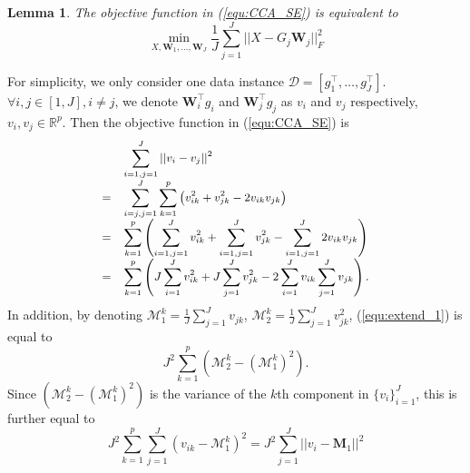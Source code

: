 \documentclass[a4paper]{article}
\newtheorem{lemma}[theorem]{Lemma}
\newenvironment{proof}[1][Proof]{\begin{trivlist}
\item[\hskip \labelsep {\bfseries #1}]}{\end{trivlist}}
\begin{document}
\begin{lemma}
The objective function in (\ref{equ:CCA_SE}) is equivalent to
\begin{equation}
        \min_{X, \mathbf{W}_1, \ldots,\mathbf{W}_J} \frac{1}{J} \sum_{j=1}^{J} ||X-G_j \mathbf{W}_j||_F^2  
\end{equation}
    \label{lemma:equ}
\end{lemma}
\begin{proof}
For simplicity, we only consider one data instance $\mathcal{D}=[g_1^\top, \ldots, g_J^\top]$. $\forall i,j\in [1,J], i\neq j$, we denote $\mathbf{W}_i^\top g_i$ and $\mathbf{W}_j^\top g_j$ as $v_i$ and $v_j$ respectively, $v_i,v_j\in\mathbb{R}^p$. Then the
    objective function in (\ref{equ:CCA_SE}) is
    \begin{equation}
        \small
        \begin{array}{cl}
              &\displaystyle\sum_{i=1,j=1}^J ||v_i-v_j||^2 \\   
            = &\displaystyle\sum_{i=j,j=1}^J \sum_{k=1}^p \left(v_{ik}^2+v_{jk}^2-2v_{ik}v_{jk}\right)\\
            = &\displaystyle\sum_{k=1}^p \left(\sum_{i=1,j=1}^J v_{ik}^2+\sum_{i=1,j=1}^J v_{jk}^2- \sum_{i=1,j=1}^J2v_{ik}v_{jk}\right) \\
            = &\displaystyle\sum_{k=1}^p \left(J\sum_{i=1}^J v_{ik}^2+J\sum_{j=1}^J v_{jk}^2- 2\sum_{i=1}^Jv_{ik}\sum_{j=1}^J v_{jk}\right).
        \end{array}
        \label{equ:extend_1}
    \end{equation}
    In addition, by denoting $\mathcal{M}_1^k=\frac{1}{J}\sum_{j=1}^{J}v_{jk}$, $\mathcal{M}_2^k=\frac{1}{J}\sum_{j=1}^{J}v_{jk}^2$, (\ref{equ:extend_1}) is equal to
    \begin{equation}
    J^2 \sum_{k=1}^p \left(\mathcal{M}_2^{k}-(\mathcal{M}_1^{k})^2\right).
    \end{equation}
    Since $\left(\mathcal{M}_2^{k}-(\mathcal{M}_1^{k})^2\right)$ is the variance of the $k$th component in $\{v_i\}_{i=1}^J$, this is further equal to
    \begin{equation}
        J^2 \sum_{k=1}^p \sum_{j=1}^J (v_{ik}-\mathcal{M}_1^k)^2=J^2 \sum_{j=1}^J ||v_i-\mathbf{M}_1||^2
        \label{equ:extend_2}
    \end{equation}

\end{proof}
\end{document}
